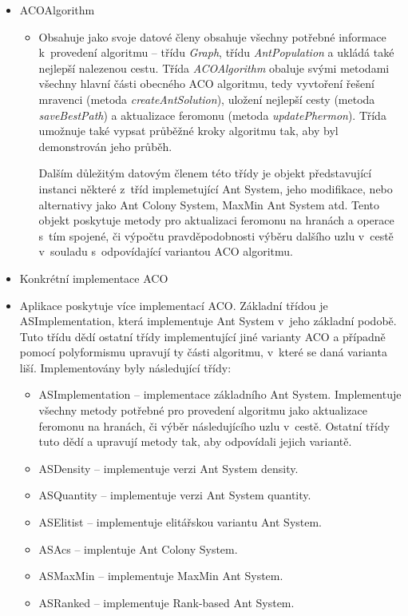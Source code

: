 \documentclass[a4paper, 12pt]{article}
\begin{document}
\begin{itemize}
  \item ACOAlgorithm
  \begin{itemize}
    \item[] Obsahuje jako svoje datové členy obsahuje všechny potřebné informace k~provedení algoritmu -- třídu
    \emph{Graph}, třídu \emph{AntPopulation} a ukládá také nejlepší nalezenou cestu. Třída \emph{ACOAlgorithm} obaluje svými metodami všechny hlavní části obecného
    ACO algoritmu, tedy vyvtoření řešení mravenci (metoda \emph{createAntSolution}), uložení nejlepší cesty (metoda \emph{saveBestPath}) 
    a aktualizace feromonu (metoda \emph{updatePhermon}). Třída umožnuje také vypsat průběžné kroky algoritmu tak, aby byl demonstrován jeho průběh.

    Dalším důležitým datovým členem této třídy je objekt představující instanci některé z~tříd implemetující Ant System, jeho modifikace, nebo alternativy jako
    Ant Colony System, MaxMin Ant System atd. Tento objekt poskytuje metody pro aktualizaci feromonu na hranách a operace s~tím spojené,
    či výpočtu pravděpodobnosti výběru dalšího uzlu v~cestě v~souladu s~odpovídající variantou ACO algoritmu.
  \end{itemize}
  \item Konkrétní implementace ACO
    \item[] Aplikace poskytuje více implementací ACO. Základní třídou je ASImplementation, která implementuje Ant System v~jeho základní podobě. Tuto třídu
    dědí ostatní třídy implementující jiné varianty ACO a případně pomocí polyformismu upravují ty části algoritmu, v~které se daná varianta liší. Implementovány
    byly následující třídy:
    \begin{itemize}
      \item ASImplementation -- implementace základního Ant System. Implementuje všechny metody potřebné pro provedení algoritmu jako aktualizace feromonu na
      hranách, či výběr následujícího uzlu v~cestě. Ostatní třídy tuto dědí a upravují metody tak, aby odpovídali jejich variantě.
      \item ASDensity -- implementuje verzi Ant System density.
      \item ASQuantity -- implementuje verzi Ant System quantity.
      \item ASElitist -- implementuje elitářskou variantu Ant System.
      \item ASAcs -- implentuje Ant Colony System.
      \item ASMaxMin -- implementuje MaxMin Ant System.
      \item ASRanked -- implementuje Rank-based Ant System.
    \end{itemize}
\end{itemize}
\end{document}
